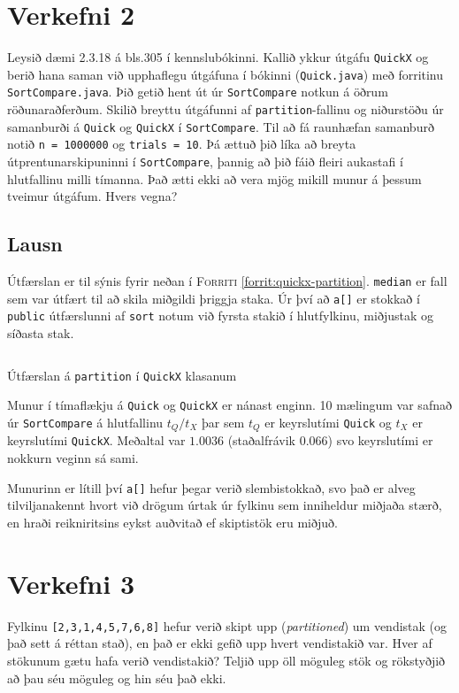 \documentclass[12pt, a4paper, hidelinks]{article}
\begin{document}
\section*{Verkefni 2}
Leysið dæmi 2.3.18 á bls.\@ 305 í kennslubókinni. Kallið ykkur útgáfu \texttt{QuickX}
og berið hana saman við upphaflegu útgáfuna í bókinni (\texttt{Quick.java}) með forritinu 
\texttt{SortCompare.java}. Þið getið hent út úr \texttt{SortCompare} notkun á öðrum röðunaraðferðum.
Skilið breyttu útgáfunni af \texttt{partition}-fallinu og niðurstöðu úr samanburði á \texttt{Quick} og
\texttt{QuickX} í \texttt{SortCompare}. Til að fá raunhæfan samanburð notið \texttt{n = 1000000} og \texttt{trials = 10}.
Þá ættuð þið líka að breyta útprentunarskipuninni í \texttt{SortCompare}, þannig að þið fáið fleiri aukastafi
í hlutfallinu milli tímanna. Það ætti ekki að vera mjög mikill munur á þessum tveimur útgáfum. Hvers vegna?

\subsection*{Lausn}
Útfærslan er til sýnis fyrir neðan í \textsc{Forriti} \ref{forrit:quickx-partition}. \texttt{median} er fall sem var útfært til
að skila miðgildi þriggja staka. Úr því að \texttt{a[]} er stokkað í \texttt{public} útfærslunni af \texttt{sort} notum við fyrsta
stakið í hlutfylkinu, miðjustak og síðasta stak.
\begin{listing}[H]
    \centering
    \inputminted[linenos, fontsize=\small, firstline=18, lastline=34, frame=single]{java}{../src/V2/QuickX.java}
    \caption{Útfærslan á \texttt{partition} í \texttt{QuickX} klasanum}
    \label{forrit:quickx-partition}
\end{listing}
\noindent
Munur í tímaflækju á \texttt{Quick} og \texttt{QuickX} er nánast enginn. 10 mælingum var safnað úr \texttt{SortCompare} á hlutfallinu $t_Q/t_X$ þar sem
$t_Q$ er keyrslutími \texttt{Quick} og $t_X$ er keyrslutími \texttt{QuickX}. Meðaltal var $1.0036$ (staðalfrávik $0.066$) svo keyrslutími er nokkurn veginn
sá sami. 

Munurinn er lítill því \texttt{a[]} hefur þegar verið slembistokkað, svo það er alveg tilviljanakennt hvort við drögum úrtak
úr fylkinu sem inniheldur miðjaða stærð, en hraði reikniritsins eykst auðvitað ef skiptistök eru miðjuð.

\newpage

\section*{Verkefni 3}
Fylkinu \texttt{[2,3,1,4,5,7,6,8]} hefur verið skipt upp (\emph{partitioned}) um vendistak (og það sett á réttan stað), en það er ekki gefið upp
hvert vendistakið var. Hver af stökunum gætu hafa verið vendistakið? Teljið upp öll möguleg stök og rökstyðjið að þau séu möguleg og hin séu það ekki.
\end{document}

